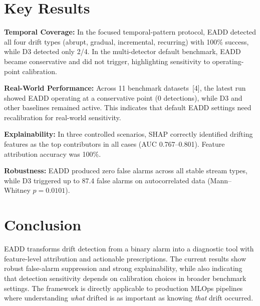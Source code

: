 \documentclass[10pt,twocolumn,a4paper]{article}
\begin{document}
\section{Key Results}

\textbf{Temporal Coverage:} In the focused temporal-pattern protocol, EADD detected all four drift types (abrupt, gradual, incremental, recurring) with 100\% success, while D3 detected only 2/4. In the multi-detector default benchmark, EADD became conservative and did not trigger, highlighting sensitivity to operating-point calibration.

\textbf{Real-World Performance:} Across 11 benchmark datasets~[4], the latest run showed EADD operating at a conservative point (0 detections), while D3 and other baselines remained active. This indicates that default EADD settings need recalibration for real-world sensitivity.

\textbf{Explainability:} In three controlled scenarios, SHAP correctly identified drifting features as the top contributors in all cases (AUC 0.767--0.801). Feature attribution accuracy was 100\%.

\textbf{Robustness:} EADD produced zero false alarms across all stable stream types, while D3 triggered up to 87.4 false alarms on autocorrelated data (Mann--Whitney $p = 0.0101$).

\section{Conclusion}

EADD transforms drift detection from a binary alarm into a diagnostic tool with feature-level attribution and actionable prescriptions. The current results show robust false-alarm suppression and strong explainability, while also indicating that detection sensitivity depends on calibration choices in broader benchmark settings. The framework is directly applicable to production MLOps pipelines where understanding \textit{what} drifted is as important as knowing \textit{that} drift occurred.

\end{document}
